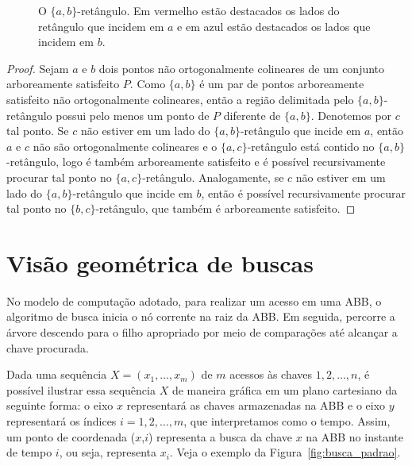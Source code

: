 \begin{figure}
    \caption{O $\{a,b\}$-retângulo. Em vermelho estão destacados os lados do retângulo que incidem em $a$ e em azul estão destacados os lados que incidem em $b$.}
\end{figure}

\begin{proof} Sejam $a$ e $b$ dois pontos não ortogonalmente colineares de um conjunto arboreamente satisfeito $P$. Como $\{a,b\}$ é um par de pontos arboreamente satisfeito não ortogonalmente colineares, então a região delimitada pelo $\{a,b\}$-retângulo possui pelo menos um ponto de $P$ diferente de $\{a,b\}$. Denotemos por $c$ tal ponto. Se $c$ não estiver em um lado do $\{a,b\}$-retângulo que incide em $a$, então $a$ e $c$ não são ortogonalmente colineares e o $\{a,c\}$-retângulo está contido no $\{a,b\}$-retângulo, logo é também arboreamente satisfeito e é possível recursivamente procurar tal ponto no $\{a,c\}$-retângulo. Analogamente, se $c$ não estiver em um lado do $\{a,b\}$-retângulo que incide em $b$, então é possível recursivamente procurar tal ponto no $\{b,c\}$-retângulo, que também é arboreamente satisfeito.
\end{proof}


\section{Visão geométrica de buscas}

No modelo de computação adotado, para realizar um acesso em uma ABB, o algoritmo de busca inicia o nó corrente na raiz da ABB. Em seguida, percorre a árvore descendo para o filho apropriado por meio de comparações até alcançar a chave procurada.

Dada uma sequência $X = (x_{1},\ldots,x_{m})$ de $m$ acessos às chaves $1,2,\ldots,n$, é possível ilustrar essa sequência $X$ de maneira gráfica em um plano cartesiano da seguinte forma: o eixo $x$ representará as chaves armazenadas na ABB e o eixo $y$ representará os índices $i = 1,2,\ldots,m$, que interpretamos como o tempo. Assim, um ponto de coordenada ($x$,$i$) representa a busca da chave $x$ na ABB no instante de tempo $i$, ou seja, representa $x_i$. Veja o exemplo da Figura~\ref{fig:busca_padrao}.

